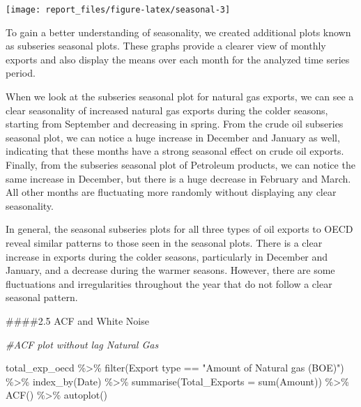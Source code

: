 \documentclass[
]{article}
\newenvironment{Shaded}{\begin{snugshade}}{\end{snugshade}}
\newcommand{\AttributeTok}[1]{\textcolor[rgb]{0.77,0.63,0.00}{#1}}
\newcommand{\CommentTok}[1]{\textcolor[rgb]{0.56,0.35,0.01}{\textit{#1}}}
\newcommand{\FunctionTok}[1]{\textcolor[rgb]{0.00,0.00,0.00}{#1}}
\newcommand{\NormalTok}[1]{#1}
\newcommand{\SpecialCharTok}[1]{\textcolor[rgb]{0.00,0.00,0.00}{#1}}
\newcommand{\StringTok}[1]{\textcolor[rgb]{0.31,0.60,0.02}{#1}}
\begin{document}
\begin{center}\texttt{[image: report\_files/figure-latex/seasonal-3]} \end{center}

To gain a better understanding of seasonality, we created additional
plots known as subseries seasonal plots. These graphs provide a clearer
view of monthly exports and also display the means over each month for
the analyzed time series period.

When we look at the subseries seasonal plot for natural gas exports, we
can see a clear seasonality of increased natural gas exports during the
colder seasons, starting from September and decreasing in spring. From
the crude oil subseries seasonal plot, we can notice a huge increase in
December and January as well, indicating that these months have a strong
seasonal effect on crude oil exports. Finally, from the subseries
seasonal plot of Petroleum products, we can notice the same increase in
December, but there is a huge decrease in February and March. All other
months are fluctuating more randomly without displaying any clear
seasonality.

In general, the seasonal subseries plots for all three types of oil
exports to OECD reveal similar patterns to those seen in the seasonal
plots. There is a clear increase in exports during the colder seasons,
particularly in December and January, and a decrease during the warmer
seasons. However, there are some fluctuations and irregularities
throughout the year that do not follow a clear seasonal pattern.

\#\#\#\#2.5 ACF and White Noise

\begin{Shaded}
\begin{Highlighting}[]
\CommentTok{\#ACF plot without lag Natural Gas}

\NormalTok{total\_exp\_oecd }\SpecialCharTok{\%\textgreater{}\%} \FunctionTok{filter}\NormalTok{(}\StringTok{\textasciigrave{}}\AttributeTok{Export type}\StringTok{\textasciigrave{}} \SpecialCharTok{==} \StringTok{"Amount of Natural gas (BOE)"}\NormalTok{) }\SpecialCharTok{\%\textgreater{}\%} 
  \FunctionTok{index\_by}\NormalTok{(Date) }\SpecialCharTok{\%\textgreater{}\%} 
  \FunctionTok{summarise}\NormalTok{(}\AttributeTok{Total\_Exports =} \FunctionTok{sum}\NormalTok{(}\StringTok{\textasciigrave{}}\AttributeTok{Amount}\StringTok{\textasciigrave{}}\NormalTok{)) }\SpecialCharTok{\%\textgreater{}\%} 
  \FunctionTok{ACF}\NormalTok{() }\SpecialCharTok{\%\textgreater{}\%}  \FunctionTok{autoplot}\NormalTok{()}
\end{Highlighting}
\end{Shaded}
\end{document}
